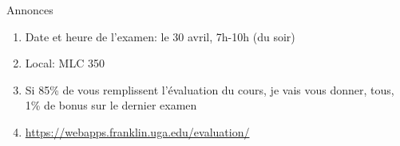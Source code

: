 \begin{frame}{Annonces}
  \begin{enumerate}
    \item Date et heure de l'examen: le 30 avril, 7h-10h (\alert{du soir})
    \item[] Local: MLC 350
    \item Si 85\% de vous remplissent l'évaluation du cours, je vais vous donner, tous, 1\% de bonus sur le dernier examen
    \item[] \href{https://webapps.franklin.uga.edu/evaluation/}{https://webapps.franklin.uga.edu/evaluation/}
  \end{enumerate}
\end{frame}